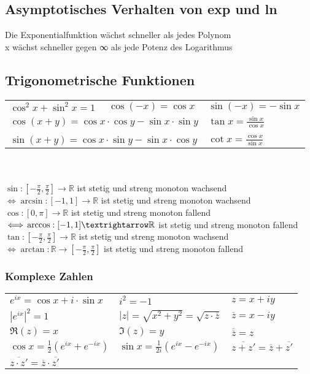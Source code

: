 \documentclass[a4paper,9pt]{extarticle}
\begin{document}
	\subsection*{Asymptotisches Verhalten von exp und ln}
	Die Exponentialfunktion wächst schneller als jedes Polynom \\
	
	x wächst schneller gegen ∞ als jede Potenz des Logarithmus
	
	\subsection*{Trigonometrische Funktionen}
	\begin{tabular}{lll}
		$ \cos^2 x + \sin^2 x = 1$ & $ \cos (-x) = \cos x $ & $\sin(-x) = -\sin x$\\
		\multicolumn{2}{l}{$\cos(x+y) = \cos x ⋅ \cos y - \sin x ⋅ \sin y$} & $\tan x = \frac{\sin x}{\cos x}$ \\
		\\
		\multicolumn{2}{l}{$\sin(x+y) = \cos x ⋅ \sin y - \sin x ⋅ \cos y$} & $\cot x = \frac{\cos x}{\sin x}$  \\				
	\end{tabular} \\
	~ \\
	
	$ \sin : [-\frac{\pi}{2}, \frac{\pi}{2}] → \mathbb{R}$ ist stetig und streng monoton wachsend$ \iff \arcsin : [-1,1] → \mathbb{R}$ ist stetig und streng monoton wachsend \\
	
	$ \cos : [0, \pi] → \mathbb{R}$ ist stetig und streng monoton fallend$ \iff \\ \arccos : [-1,1] → \mathbb{R}$ ist stetig und streng monoton fallend \\
	
	$ \tan : [-\frac{\pi}{2}, \frac{\pi}{2}] → \mathbb{R}$ ist stetig und streng monoton wachsend$ \iff \arctan : \mathbb{R} → [-\frac{\pi}{2}, \frac{\pi}{2}]$ ist stetig und streng monoton fallend

	\subsubsection*{Komplexe Zahlen}
	\begin{tabular}{lll}
		$e^{ix} = \cos x + i ⋅ \sin x $ & $i^2 = -1$ & $z = x + iy$\\
		$|e^{ix}|^2 = 1$ & $|z| = \sqrt{x^2 + y^2} = \sqrt{z ⋅ \overline{z}}$ & $\overline{z} = x - iy$ \\
		$\Re(z) = x$ & $\Im(z) = y$ & $\overline{\overline{z}} = z$ \\
		$\cos x = \frac{1}{2} (e^{ix} + e^{-ix})$ & $\sin x = \frac{1}{2i} (e^{ix} - e^{-ix})$ & $\overline{z + z'} = \overline{z} + \overline{z'}$ \\
		$\overline{z ⋅ z'} = \overline{z} ⋅ \overline{z'}$
		
	\end{tabular}
\end{document}
